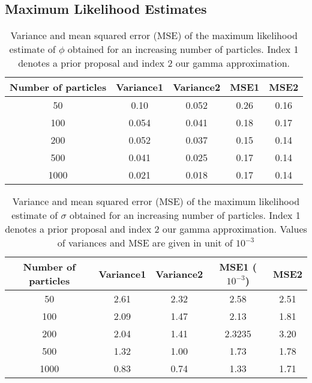 \documentclass[12pt]{article}
\newcommand{\ra}[1]{\renewcommand{\arraystretch}{#1}}
\begin{document}
\begin{appendices}
	\subsection{Maximum Likelihood Estimates}
	\begin{table}[htb]
		\centering
		\vspace{5mm}
		\ra{1.3}
		\begin{tabular}{@{}ccccc@{}} \toprule
			Number of particles & Variance1 &  Variance2 & MSE1 & MSE2 \\ \midrule
			50 & 0.10 & 0.052 & 0.26 & 0.16\\
			100 & 0.054 & 0.041 & 0.18 & 0.17\\ 
			200 & 0.052 & 0.037 & 0.15 & 0.14\\ 
			500 & 0.041 & 0.025 & 0.17 & 0.14\\
			1000 & 0.021 & 0.018 & 0.17 & 0.14 \\ \bottomrule
		\end{tabular}
		\caption[Variance and mean squared error of the MLE of $\phi$]{Variance and mean squared error (MSE) of the maximum likelihood estimate of $\phi$ obtained for an increasing number of particles. Index 1 denotes a prior proposal and index 2 our gamma approximation.}
		\label{table:mlePhi}
		\vspace{5mm}
	\end{table}
	
	\begin{table}[htb]
		\centering
		\vspace{5mm}
		\ra{1.3}
		\begin{tabular}{@{}ccccc@{}} \toprule
			Number of particles & Variance1 &  Variance2 & MSE1 ($10^{-3}$)& MSE2\\ \midrule
			50 & 2.61 & 2.32 & 2.58 & 2.51\\
			100 & 2.09 & 1.47 & 2.13 & 1.81\\
			200 & 2.04 & 1.41 &  2.3235  & 3.20\\ 
			500 & 1.32 & 1.00 & 1.73 & 1.78\\
			1000 & 0.83 & 0.74 & 1.33 & 1.71 \\  \bottomrule
		\end{tabular}
		\caption[Variance and mean squared error of the MLE of $\sigma$]{Variance and mean squared error (MSE) of the maximum likelihood estimate of $\sigma$ obtained  for an increasing number of particles. Index 1 denotes a prior proposal and index 2 our gamma approximation. Values of variances and MSE are given in unit of $10^{-3}$}
		\vspace{5mm}
		\label{table:mleSigma}
	\end{table}
	

\end{appendices}
\end{document}
